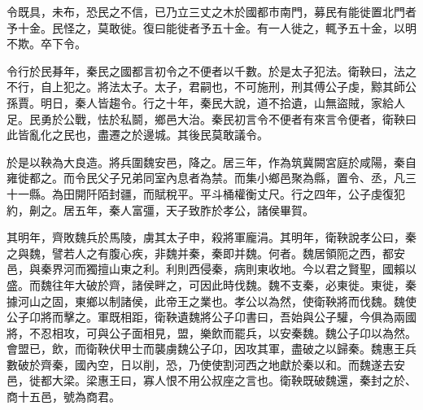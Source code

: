 令既具，未布，恐民之不信，已乃立三丈之木於國都市南門，募民有能徙置北門者予十金。民怪之，莫敢徙。復曰能徙者予五十金。有一人徙之，輒予五十金，以明不欺。卒下令。

令行於民朞年，秦民之國都言初令之不便者以千數。於是太子犯法。衛鞅曰，法之不行，自上犯之。將法太子。太子，君嗣也，不可施刑，刑其傅公子虔，黥其師公孫賈。明日，秦人皆趨令。行之十年，秦民大說，道不拾遺，山無盜賊，家給人足。民勇於公戰，怯於私鬬，鄉邑大治。秦民初言令不便者有來言令便者，衛鞅曰此皆亂化之民也，盡遷之於邊城。其後民莫敢議令。

於是以鞅為大良造。將兵圍魏安邑，降之。居三年，作為筑冀闕宮庭於咸陽，秦自雍徙都之。而令民父子兄弟同室內息者為禁。而集小鄉邑聚為縣，置令、丞，凡三十一縣。為田開阡陌封疆，而賦稅平。平斗桶權衡丈尺。行之四年，公子虔復犯約，劓之。居五年，秦人富彊，天子致胙於孝公，諸侯畢賀。

其明年，齊敗魏兵於馬陵，虜其太子申，殺將軍龐涓。其明年，衛鞅說孝公曰，秦之與魏，譬若人之有腹心疾，非魏并秦，秦即并魏。何者。魏居領阨之西，都安邑，與秦界河而獨擅山東之利。利則西侵秦，病則東收地。今以君之賢聖，國賴以盛。而魏往年大破於齊，諸侯畔之，可因此時伐魏。魏不支秦，必東徙。東徙，秦據河山之固，東鄉以制諸侯，此帝王之業也。孝公以為然，使衛鞅將而伐魏。魏使公子卬將而擊之。軍既相距，衛鞅遺魏將公子卬書曰，吾始與公子驩，今俱為兩國將，不忍相攻，可與公子面相見，盟，樂飲而罷兵，以安秦魏。魏公子卬以為然。會盟已，飲，而衛鞅伏甲士而襲虜魏公子卬，因攻其軍，盡破之以歸秦。魏惠王兵數破於齊秦，國內空，日以削，恐，乃使使割河西之地獻於秦以和。而魏遂去安邑，徙都大梁。梁惠王曰，寡人恨不用公叔座之言也。衛鞅既破魏還，秦封之於、商十五邑，號為商君。

